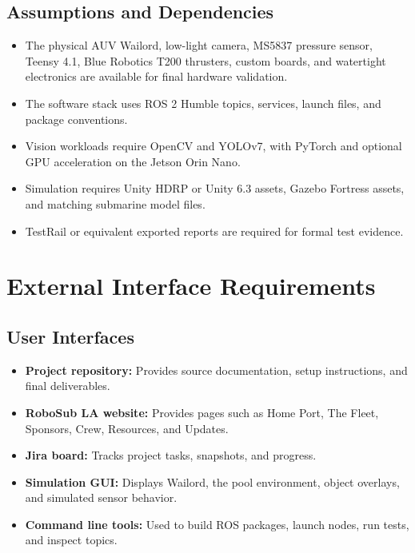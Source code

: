 \documentclass[12pt]{article}
\begin{document}
\subsection{Assumptions and Dependencies}
\begin{itemize}[leftmargin=*]
  \item The physical AUV Wailord, low-light camera, MS5837 pressure sensor, Teensy 4.1, Blue Robotics T200 thrusters, custom boards, and watertight electronics are available for final hardware validation.
  \item The software stack uses ROS 2 Humble topics, services, launch files, and package conventions.
  \item Vision workloads require OpenCV and YOLOv7, with PyTorch and optional GPU acceleration on the Jetson Orin Nano.
  \item Simulation requires Unity HDRP or Unity 6.3 assets, Gazebo Fortress assets, and matching submarine model files.
  \item TestRail or equivalent exported reports are required for formal test evidence.
\end{itemize}

\section{External Interface Requirements}
\subsection{User Interfaces}
\begin{itemize}[leftmargin=*]
  \item \textbf{Project repository:} Provides source documentation, setup instructions, and final deliverables.
  \item \textbf{RoboSub LA website:} Provides pages such as Home Port, The Fleet, Sponsors, Crew, Resources, and Updates.
  \item \textbf{Jira board:} Tracks project tasks, snapshots, and progress.
  \item \textbf{Simulation GUI:} Displays Wailord, the pool environment, object overlays, and simulated sensor behavior.
  \item \textbf{Command line tools:} Used to build ROS packages, launch nodes, run tests, and inspect topics.
\end{itemize}
\end{document}
